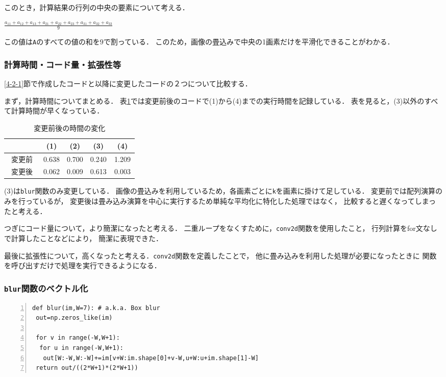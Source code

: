 \documentclass[autodetect-engine,dvi=dvipdfmx,ja=standard,
               a4j,11pt]{bxjsarticle}
\begin{document}
このとき，計算結果の行列の中央の要素について考える．

$\frac{a_{11} + a_{12} + a_{13} + a_{21} + a_{22} + a_{23} + a_{31} + a_{32} + a_{33}}{9}$

この値は\verb|A|のすべての値の和を$9$で割っている．
このため，画像の畳込みで中央の1画素だけを平滑化できることがわかる．

\subsubsection{計算時間・コード量・拡張性等}

\ref{4-2-1}節で作成したコードと以降に変更したコードの２つについて比較する．

まず，計算時間についてまとめる．
表\ref{table:4-2-1}では変更前後のコードで(1)から(4)までの実行時間を記録している．
表を見ると，(3)以外のすべて計算時間が早くなっている．

\begin{table}[htbp]
\centering
\caption{変更前後の時間の変化}\label{table:4-2-1}
\begin{tabular}{|c||c|c|c|c|}
\hline
 & (1) & (2) & (3) & (4)　\\
\hline
変更前 & 0.638 & 0.700 & 0.240 & 1.209 \\
変更後　& 0.062 & 0.009 & 0.613 & 0.003 \\
\hline
\end{tabular}\end{table}

(3)は\verb|blur|関数のみ変更している．
画像の畳込みを利用しているため，各画素ごとに\verb|k|を画素に掛けて足している．
変更前では配列演算のみを行っているが，
変更後は畳み込み演算を中心に実行するため単純な平均化に特化した処理ではなく，
比較すると遅くなってしまったと考える．

つぎにコード量について，より簡潔になったと考える．
二重ループをなくすために，\verb|conv2d|関数を使用したこと，
行列計算をfor文なしで計算したことなどにより，
簡潔に表現できた．

最後に拡張性について，高くなったと考える．\verb|conv2d|関数を定義したことで，
他に畳み込みを利用した処理が必要になったときに
関数を呼び出すだけで処理を実行できるようになる．

\subsubsection{\texttt{blur}関数のベクトル化}

\begin{Verbatim}[numbers=left, xleftmargin=10mm, numbersep=6pt,
                    fontsize=\small, baselinestretch=0.8]
def blur(im,W=7): # a.k.a. Box blur
 out=np.zeros_like(im)

 for v in range(-W,W+1):
  for u in range(-W,W+1):
   out[W:-W,W:-W]+=im[v+W:im.shape[0]+v-W,u+W:u+im.shape[1]-W]
 return out/((2*W+1)*(2*W+1))
\end{Verbatim}
\end{document}
